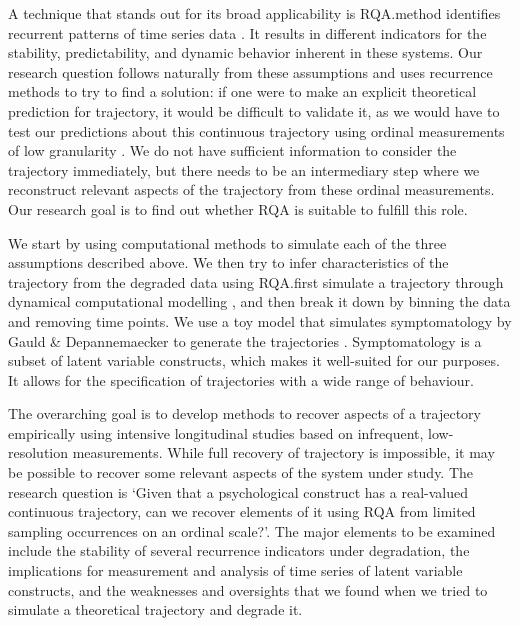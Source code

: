 \documentclass[utf8]{FrontiersinVancouver}
\begin{document}
A technique that stands out for its broad applicability is RQA.\@This method identifies recurrent patterns of time series data \citep{webber2005recurrence}. It results in different indicators for the stability, predictability, and dynamic behavior inherent in these systems. Our research question follows naturally from these assumptions and uses recurrence methods to try to find a solution: if one were to make an explicit theoretical prediction for trajectory, it would be difficult to validate it, as we would have to test our predictions about this continuous trajectory using ordinal measurements of low granularity \citep{haslbeckRecoveringWithinpersonDynamics2022}. We do not have sufficient information to consider the trajectory immediately, but there needs to be an intermediary step where we reconstruct relevant aspects of the trajectory from these ordinal measurements. Our research goal is to find out whether RQA is suitable to fulfill this role. 

We start by using computational methods to simulate each of the three assumptions described above. We then try to infer characteristics of the trajectory from the degraded data using RQA.\@We first simulate a trajectory through dynamical computational modelling \citep{grahekAnatomyPsychologicalTheory2021,gauldDynamicalSystemsComputational2023}, and then break it down by binning the data and removing time points. We use a toy model that simulates symptomatology by Gauld \& Depannemaecker to generate the trajectories \citep{gauldDynamicalSystemsComputational2023}. Symptomatology is a subset of latent variable constructs, which makes it well-suited for our purposes. It allows for the specification of trajectories with a wide range of behaviour. 

The overarching goal is to develop methods to recover aspects of a trajectory empirically using intensive longitudinal studies based on infrequent, low-resolution measurements. While full recovery of trajectory is impossible, it may be possible to recover some relevant aspects of the system under study. The research question is `Given that a psychological construct has a real-valued continuous trajectory, can we recover elements of it using RQA from limited sampling occurrences on an ordinal scale?'. The major elements to be examined include the stability of several recurrence indicators under degradation, the implications for measurement and analysis of time series of latent variable constructs, and the weaknesses and oversights that we found when we tried to simulate a theoretical trajectory and degrade it.  
\end{document}
